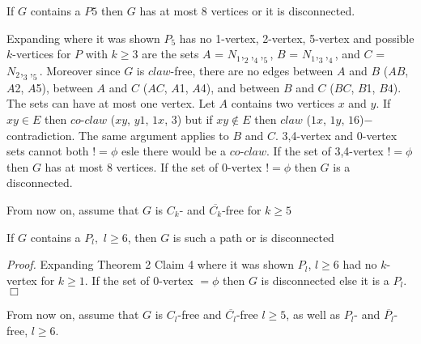 \begin{Lemma}\label{lem:P58V}
If $G$ contains a $P5$ then $G$ has at most 8 vertices or it is disconnected.
\end{Lemma}
 Expanding \cite{BraFud2002} where it was shown $P_5$ has no 1-vertex, 2-vertex, 5-vertex and possible $k$-vertices for $P$ with $k \geq 3$ are the sets $A$ = $N_1,_2,_4,_5$, $B$ = $N_1,_3,_4$, and $C$ = $N_2,_3,_5$. Moreover since $G$ is $claw$-free, there are no edges between $A$ and $B$ ($AB$, $A$2, $A$5), between $A$ and $C$ ($AC$, $A$1, $A$4), and between $B$ and $C$ ($BC$, $B$1, $B4$). The sets can have at most one vertex. Let $A$ contains two vertices $x$ and $y$. If $xy \in E$ then $co$-$claw$ ($xy$, $y1$, $1x$, $3$) but if $xy \not\in E$ then $claw$ ($1x$, $1y$, $16$)$-$contradiction. The same argument applies to $B$ and $C$. 3,4-vertex and 0-vertex sets cannot both $!= \phi$ esle there would be a $co$-$claw$. If the set of 3,4-vertex $!= \phi$ then $G$ has at most 8 vertices. If the set of 0-vertex $!= \phi$ then $G$ is a disconnected.

From now on, assume that $G$ is $C_k$- and $\overline{C_k}$-free for $k \geq 5$

\begin{Lemma}\label{lem:P6Path}
If $G$ contains a $P_l,$ $l \geq 6$, then $G$ is such a path or is disconnected
\end{Lemma}
{\it Proof.} Expanding \cite{BraFud2002} Theorem 2 Claim 4 where it was shown $P_l$, $l \geq 6$ had no $k$-vertex for $k \geq 1$. If the set of 0-vertex $= \phi$ then $G$ is disconnected else it is a $P_l$.  $\Box$

From now on, assume that $G$ is $C_l$-free and $\overline{C_l}$-free $l \geq 5$, as well as $P_l$- and $\overline{P_l}$-free, $l \geq 6$.